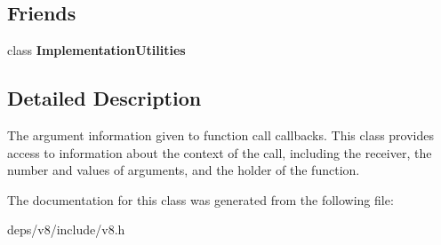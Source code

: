 \subsection*{Friends}
\begin{DoxyCompactItemize}
\item 
\hypertarget{classv8_1_1_arguments_ac7b520085953e146d849e05253267f72}{}class {\bfseries Implementation\+Utilities}\label{classv8_1_1_arguments_ac7b520085953e146d849e05253267f72}

\end{DoxyCompactItemize}


\subsection{Detailed Description}
The argument information given to function call callbacks. This class provides access to information about the context of the call, including the receiver, the number and values of arguments, and the holder of the function. 

The documentation for this class was generated from the following file\+:\begin{DoxyCompactItemize}
\item 
deps/v8/include/v8.\+h\end{DoxyCompactItemize}
